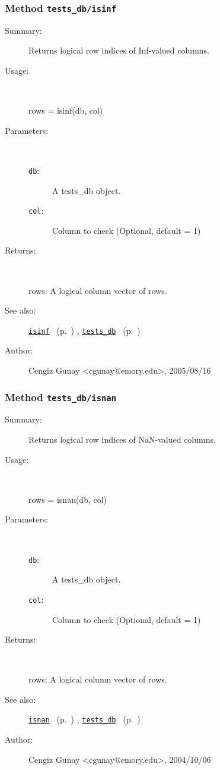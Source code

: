 \subsubsection[Method \texttt{isinf}]{Method \texttt{tests\_db/isinf}}%
%
\label{ref_tests_db__isinf}%
\hypertarget{ref_tests_db__isinf}{}%
\begin{description}
\item[Summary:]Returns logical row indices of Inf-valued columns.
%
\item[Usage:]~%
\begin{lyxcode}%
rows = isinf(db, col)
%
\end{lyxcode}%
%
%
\item[Parameters:]~
\begin{description}%
\item[\texttt{db}:]
 A tests\_db object.
\item[\texttt{col}:]
 Column to check (Optional, default = 1)
\end{description}%
%
\item[Returns:
]~

	rows: A logical column vector of rows.
%
%
\item[See also:]%
\hyperlink{ref_isinf}{\texttt{isinf}}%
\ (p.~\pageref{ref_isinf})%
%
, \hyperlink{ref_tests_db}{\texttt{tests\_db}}%
\ (p.~\pageref{ref_tests_db})%
%
%
\item[Author:]%
Cengiz Gunay <cgunay@emory.edu>, 2005/08/16
%
\end{description}
\methodline%
\subsubsection[Method \texttt{isnan}]{Method \texttt{tests\_db/isnan}}%
%
\label{ref_tests_db__isnan}%
\hypertarget{ref_tests_db__isnan}{}%
\begin{description}
\item[Summary:]Returns logical row indices of NaN-valued columns.
%
\item[Usage:]~%
\begin{lyxcode}%
rows = isnan(db, col)
%
\end{lyxcode}%
%
%
\item[Parameters:]~
\begin{description}%
\item[\texttt{db}:]
 A tests\_db object.
\item[\texttt{col}:]
 Column to check (Optional, default = 1)
\end{description}%
%
\item[Returns:
]~

	rows: A logical column vector of rows.
%
%
\item[See also:]%
\hyperlink{ref_isnan}{\texttt{isnan}}%
\ (p.~\pageref{ref_isnan})%
%
, \hyperlink{ref_tests_db}{\texttt{tests\_db}}%
\ (p.~\pageref{ref_tests_db})%
%
%
\item[Author:]%
Cengiz Gunay <cgunay@emory.edu>, 2004/10/06
%
\end{description}
\methodline%
